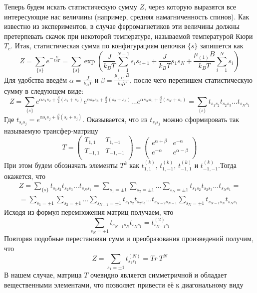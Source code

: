 \documentclass[oneside,final,14pt]{extarticle}
\begin{document}
	Теперь будем искать статистическую сумму $Z$, через которую выразятся все интересующие нас величины (например, средняя намагниченность спинов). Как известно из экспериментов, в случае ферромагнетиков эти величины должны претерпевать скачок при некоторой температуре, называемой температурой Кюри $T_{c}$. Итак, статистическая сумма по конфигурациям цепочки $\{s\}$ запишется как
$$Z=\sum_{\{s\}}e^{-\frac{E}{k_{B}T}}=\sum_{\{s\}}\exp\left(\frac{J}{k_{B}T}\sum_{i=1}^{N-1}s_{i}s_{i+1}+\frac{J}{k_{B}T}s_{1}s_{N}+\frac{\mu_{(1)}B}{k_{B}T}\sum_{i=1}^{N}s_{i}\right)$$
	Для удобства введём $\alpha=\frac{J}{k_{B}T}$ и $\beta=\frac{\mu_{(1)}B}{k_{B}T}$, после чего перепишем статистическую сумму в следующем виде:
$$Z=\sum_{\{s\}}e^{\alpha s_{1}s_{2}+\frac{\beta}{2}(s_{1}+s_{2})}e^{\alpha s_{2}s_{3}+\frac{\beta}{2}(s_{2}+s_{3})}\ldots e^{\alpha s_{N}s_{1}+\frac{\beta}{2}(s_{N}+s_{1})}=\sum_{\{s\}}t_{s_{1}s_{2}}t_{s_{2}s_{3}}\ldots t_{s_{N}s_{1}}$$
	Где $t_{s_{i}s_{j}}=e^{\alpha s_{i}s_{j}+\frac{\beta}{2}(s_{i}+s_{j})}$. Оказывается, что из $t_{s_{i}s_{j}}$ можно сформировать так называемую трансфер-матрицу 
$$T=
\begin{pmatrix}
T_{1, 1} & T_{1, -1} \\
T_{-1, 1} & T_{-1, -1} \\
\end{pmatrix}=
\begin{pmatrix}
e^{\alpha+\beta} & e^{-\alpha} \\
e^{-\alpha} & e^{\alpha-\beta} \\
\end{pmatrix}$$
	При этом будем обозначать элементы $T^{k}$ как $t^{(k)}_{1, 1}$, $t^{(k)}_{1, -1}$, $t^{(k)}_{-1, 1}$ и $t^{(k)}_{-1, -1}$.Тогда окажется, что 
\begin{multline*}
Z=\sum_{\{s\}}t_{s_{1}s_{2}}t_{s_{2}s_{3}}\ldots t_{s_{N}s_{1}}=\sum_{s_{1}=\pm 1}\sum_{s_{2}=\pm 1}\ldots\sum_{s_{N}=\pm 1}t_{s_{1}s_{2}}t_{s_{2}s_{3}}\ldots t_{s_{N}s_{1}}= \\= \sum_{s_{1}=\pm 1}\sum_{s_{2}=\pm 1}\ldots\sum_{s_{N-1}=\pm 1}t_{s_{1}s_{2}}t_{s_{2}s_{3}}\ldots t_{s_{N-2}s_{N-1}}\sum_{s_{N}=\pm 1}t_{s_{N-1}s_{N}}t_{s_{N}s_{1}}
\end{multline*}
	Исходя из формул перемножения матриц получаем, что 
$$\sum_{s_{N}=\pm 1}t_{s_{N-1}s_{N}}t_{s_{N}s_{1}}=t^{(2)}_{s_{N-1}s_{1}}$$
	Повторяя подобные перестановки сумм и преобразования произведений получим, что 
$$Z=\sum_{s_{1}=\pm 1}t^{(N)}_{s_{1}s_{1}}=Tr \ T^{N}$$
	В нашем случае, матрица $T$ очевидно является симметричной и обладает вещественными элементами, что позволяет привести её к диагональному виду 
\end{document}
